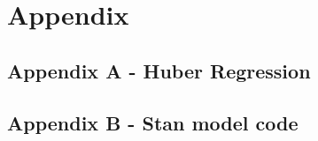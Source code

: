 \chapter{Appendix}

\section{Appendix A - Huber Regression}

\label{sec:huber_reg}
\cleardoubleoddpage

\section{Appendix B - Stan model code}

\label{sec:model_code}
\cleardoubleoddpage

